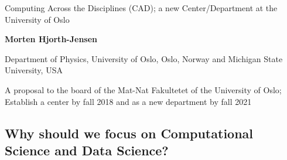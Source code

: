 \documentclass[%
oneside,                 %
final,                   %
10pt]{article}
\begin{document}

\newcommand{\exercisesection}[1]{\subsection*{#1}}






\thispagestyle{empty}

\begin{center}
{\LARGE\bf
\begin{spacing}{1.25}
Computing Across the Disciplines (CAD); a new Center/Department at the University of Oslo
\end{spacing}
}
\end{center}


\begin{center}
{\bf Morten Hjorth-Jensen}
\end{center}

    \begin{center}
\centerline{{\small Department of Physics, University of Oslo, Oslo, Norway  and Michigan State University, USA}}
\end{center}
    

\begin{center}
A proposal to the board of the Mat-Nat Fakultetet of the University of Oslo; Establish a center by fall 2018 and as a new department by fall 2021
\end{center}

\vspace{1cm}


\subsection{Why should we focus on Computational Science and Data Science?}
\end{document}
